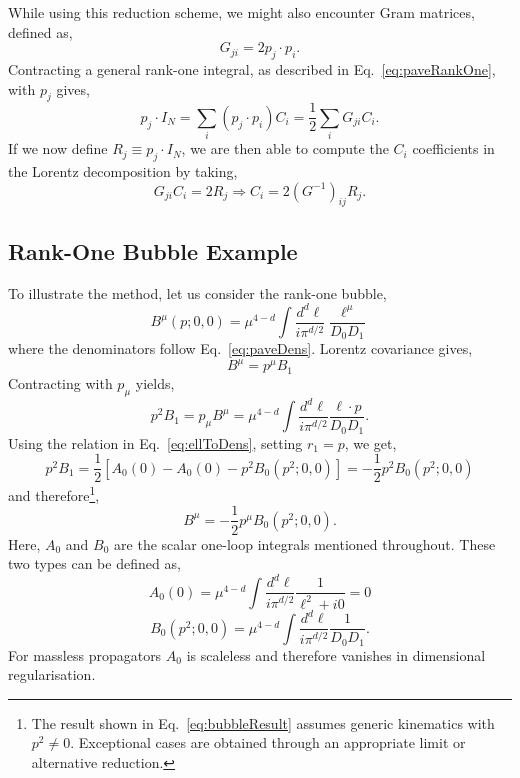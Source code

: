 While using this reduction scheme, we might also encounter Gram matrices, defined as,
\begin{equation}
    G_{ji} = 2p_j\cdot p_i.
\end{equation}
Contracting a general rank-one integral, as described in Eq.~\eqref{eq:paveRankOne},
with $p_j$ gives,
\begin{equation}
    p_j\cdot I_N = \sum_i(p_j\cdot p_i)C_i = \frac12\sum_iG_{ji}C_i.
\end{equation}
If we now define $R_j\equiv p_j\cdot I_N$, we are then able to compute the $C_i$
coefficients in the Lorentz decomposition by taking,
\begin{equation}\label{eq:gramInversion}
    G_{ji}C_i = 2R_j\Rightarrow C_i = 2\left(G^{-1}\right)_{ij}R_j.
\end{equation}

\subsection{Rank-One Bubble Example}

To illustrate the method, let us consider the rank-one bubble,
\begin{equation}
    B^\mu\!\left(p;0,0\right)=\mu^{4-d}\int\frac{d^d\ell}{i\pi^{d/2}}\frac{\ell^\mu}{D_0D_1}
\end{equation}
where the denominators follow Eq.~\eqref{eq:paveDens}. Lorentz covariance gives,
\begin{equation}
    B^\mu = p^\mu B_1
\end{equation}
Contracting with $p_\mu$ yields,
\begin{equation}
    p^2B_1 = p_\mu B^\mu = \mu^{4-d}\int\frac{d^d\ell}{i\pi^{d/2}}\frac{\ell\cdot p}{D_0D_1}.
\end{equation}
Using the relation in Eq.~\eqref{eq:ellToDens}, setting $r_1 = p$, we get,
\begin{equation}
    p^2B_1 = \frac12\left[A_0\!\left(0\right)-A_0\!\left(0\right)-p^2B_0\!\left(p^2;0,0\right)\right] = -\frac12p^2B_0\!\left(p^2;0,0\right)
\end{equation}
and therefore\footnote{The result shown in Eq.~\eqref{eq:bubbleResult} assumes generic 
kinematics with $p^2\neq 0$. Exceptional cases are obtained through an appropriate 
limit or alternative reduction.},
\begin{equation}\label{eq:bubbleResult}
    B^\mu = -\frac12p^\mu B_0\!\left(p^2;0,0\right).
\end{equation}
Here, $A_0$ and $B_0$ are the scalar one-loop integrals mentioned throughout. These 
two types can be defined as,
\begin{equation*}
    A_0\!\left(0\right) = \mu^{4-d}\int\frac{d^d\ell}{i\pi^{d/2}}\frac1{\ell^2+i0} = 0
\end{equation*}
\begin{equation}
    B_0\!\left(p^2;0,0\right) = \mu^{4-d}\int\frac{d^d\ell}{i\pi^{d/2}}\frac1{D_0D_1}.
\end{equation}
For massless propagators $A_0$ is scaleless and therefore vanishes in dimensional regularisation.

